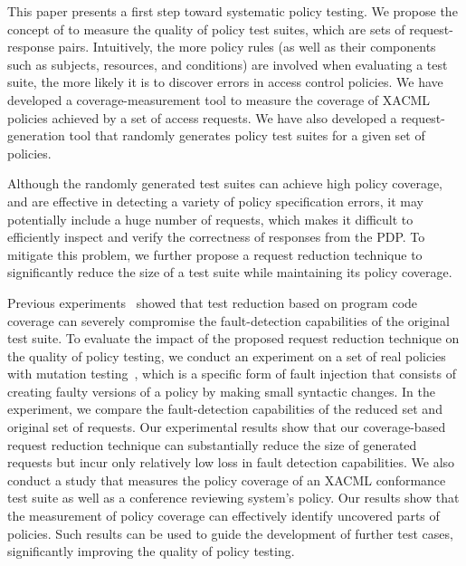 This paper presents a first step toward systematic policy testing.
We propose the concept of  to measure the
quality of policy test suites, which are sets of request-response
pairs. Intuitively, the more policy rules (as well as their
components such as subjects, resources, and conditions) are involved
when evaluating a test suite, the more likely it is to discover
errors in access control policies. We have developed a
coverage-measurement tool to measure the coverage of XACML policies
achieved by a set of access requests. We have also developed a
request-generation tool that randomly generates policy test suites
for a given set of policies.

Although the randomly generated test suites can achieve high policy
coverage, and are effective in detecting a variety of policy
specification errors, it may potentially include a huge number of
requests, which makes it difficult to efficiently inspect and verify
the correctness of responses from the PDP. To mitigate this problem,
we further propose a request reduction technique to significantly
reduce the size of a test suite while maintaining its policy
coverage.

Previous experiments~\cite{rothermel98:empirical} showed that test
reduction based on program code coverage can severely compromise the
fault-detection capabilities of the original test suite. To evaluate
the impact of the proposed request reduction technique on the
quality of policy testing, we conduct an experiment on a set of real
policies with mutation testing~\cite{demillo78:hints}, which is a
specific form of fault injection that consists of creating faulty
versions of a policy by making small syntactic changes. In the
experiment, we compare the fault-detection capabilities of the
reduced set and original set of requests. Our experimental results
show that our coverage-based request reduction technique can
substantially reduce the size of generated requests but incur only
relatively low loss in fault detection capabilities. We also conduct
a study that measures the policy coverage of an XACML conformance
test suite as well as a conference reviewing system's policy. Our
results show that the measurement of policy coverage can effectively
identify uncovered parts of policies. Such results can be used to
guide the development of further test cases, significantly improving
the quality of policy testing.

